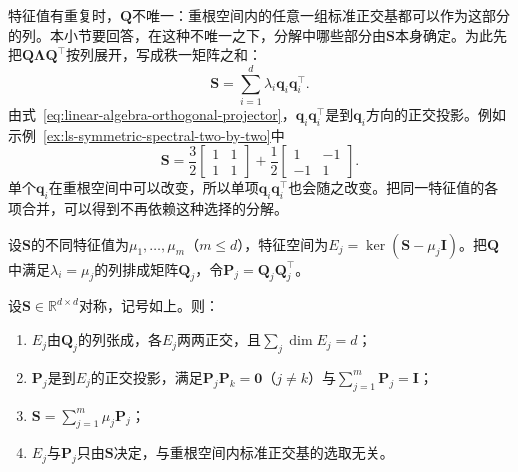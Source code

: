 特征值有重复时，$\bm Q$不唯一：重根空间内的任意一组标准正交基都可以作为这部分的列。本小节要回答，在这种不唯一之下，分解中哪些部分由$\bm S$本身确定。为此先把$\bm Q\bm\Lambda\bm Q^\top$按列展开，写成秩一矩阵之和：
\[
 \bm S=\sum_{i=1}^d\lambda_i\bm q_i\bm q_i^\top .
\]
由式~\eqref{eq:linear-algebra-orthogonal-projector}，$\bm q_i\bm q_i^\top$是到$\bm q_i$方向的正交投影。例如示例~\ref{ex:ls-symmetric-spectral-two-by-two}中
\[
 \bm S=\frac32\begin{bmatrix}1&1\\1&1\end{bmatrix}+\frac12\begin{bmatrix}1&-1\\-1&1\end{bmatrix}.
\]
单个$\bm q_i$在重根空间中可以改变，所以单项$\bm q_i\bm q_i^\top$也会随之改变。把同一特征值的各项合并，可以得到不再依赖这种选择的分解。

设$\bm S$的不同特征值为$\mu_1,\ldots,\mu_m$（$m\leq d$），特征空间为$E_j=\ker(\bm S-\mu_j\bm I)$。把$\bm Q$中满足$\lambda_i=\mu_j$的列排成矩阵$\bm Q_j$，令$\bm P_j=\bm Q_j\bm Q_j^\top$。

\begin{theorem}[谱投影]
\label{thm:ls-spectral-projections}
设$\bm S\in\mathbb R^{d\times d}$对称，记号如上。则：
\begin{enumerate}
 \item $E_j$由$\bm Q_j$的列张成，各$E_j$两两正交，且$\sum_j\dim E_j=d$；
 \item $\bm P_j$是到$E_j$的正交投影，满足$\bm P_j\bm P_k=\bm0$（$j\neq k$）与$\sum_{j=1}^m\bm P_j=\bm I$；
 \item $\bm S=\sum_{j=1}^m\mu_j\bm P_j$；
 \item $E_j$与$\bm P_j$只由$\bm S$决定，与重根空间内标准正交基的选取无关。
\end{enumerate}
\end{theorem}

